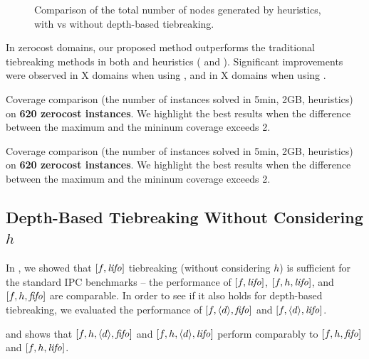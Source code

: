 \begin{figure}[htb]
 \centering
 \caption{Comparison of the total number of nodes generated by \mands
 heuristics, with vs without depth-based tiebreaking.}
 \label{tbl:mands-evaluations}
\end{figure}

In zerocost domains, our proposed method outperforms the traditional
tiebreaking methods in both \lmcut and \mands heuristics
( and ).
Significant improvements were observed in X domains when using \lmcut,
and in X domains when using \mands.

\begin{table}[htbp]
 {
 \centering
 
 \caption{
 Coverage comparison (the number of instances solved in 5min, 2GB, \lmcut heuristics) 
 on \textbf{620 zerocost instances}. We highlight the
 best results when the difference between the maximum and the mininum coverage exceeds 2.
 }
 \label{lmcut-zerocost-full}
 }
\end{table}

\begin{table}[htbp]
 {
 \centering
 
 \caption{
 Coverage comparison (the number of instances solved in 5min, 2GB, \mands heuristics)
 on \textbf{620 zerocost instances}. We highlight the
 best results when the difference between the maximum and the mininum coverage exceeds 2.
 }
 \label{mands-zerocost-full}
 }
\end{table}



\subsection{Depth-Based Tiebreaking Without Considering $h$}

In , we showed that $[f,{\mbox{\textit{lifo}}}]$ tiebreaking
(without considering $h$) is sufficient for the standard IPC benchmarks
-- the performance of $[f,{\mbox{\textit{lifo}}}]$, $[f,h,{\mbox{\textit{lifo}}}]$, and $[f,h,{\mbox{\textit{fifo}}}]$ are
comparable.  In order to see if it also holds for depth-based
tiebreaking, we evaluated the performance of $[f,{\left<d\right>},{\mbox{\textit{fifo}}}]$
and $[f,{\left<d\right>},{\mbox{\textit{lifo}}}]$.

 and 
 shows that
 $[f,h,{\left<d\right>},{\mbox{\textit{fifo}}}]$ and  $[f,h,{\left<d\right>},{\mbox{\textit{lifo}}}]$
 perform comparably to $[f,h,{\mbox{\textit{fifo}}}]$ and $[f,h,{\mbox{\textit{lifo}}}]$.

